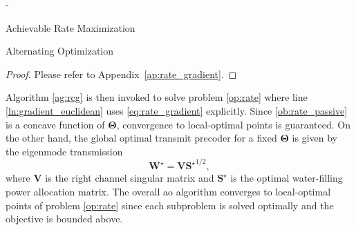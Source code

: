 \begin{section}{-}
\begin{subsection}{Achievable Rate Maximization}
\begin{subsubsection}{Alternating Optimization}
			\begin{proof}
				Please refer to Appendix~\ref{ap:rate_gradient}.
			\end{proof}
			Algorithm \ref{ag:rcg} is then invoked to solve problem \eqref{op:rate} where line \ref{ln:gradient_euclidean} uses \eqref{eq:rate_gradient} explicitly.
			Since \eqref{ob:rate_passive} is a concave function of $\mathbf{\Theta}$, convergence to local-optimal points is guaranteed.
			On the other hand, the global optimal transmit precoder for a fixed $\mathbf{\Theta}$ is given by the eigenmode transmission \cite{Clerckx2013}
			\begin{equation}
				\mathbf{W}^\star = \mathbf{V} {\mathbf{S}^\star}^{1/2},
				\label{eq:precoder_eigenmode}
			\end{equation}
			where $\mathbf{V}$ is the right channel singular matrix and $\mathbf{S}^\star$ is the optimal water-filling power allocation matrix.
			The overall \gls{ao} algorithm converges to local-optimal points of problem \eqref{op:rate} since each subproblem is solved optimally and the objective is bounded above.
		\end{subsubsection}


\end{subsection}
\end{section}
